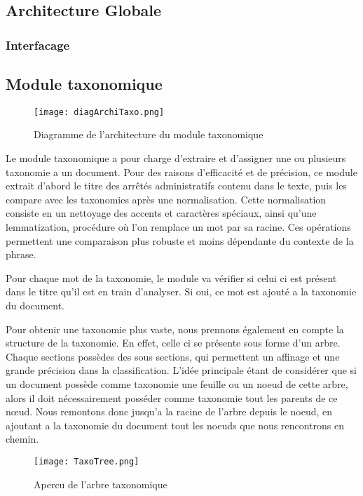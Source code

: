 \subsection{Architecture Globale}

\subsubsection{Interfacage}

\subsection{Module taxonomique}

\begin{figure}[h!]
  \centering
  \texttt{[image: diagArchiTaxo.png]}
	\caption[]{Diagramme de l'architecture du module taxonomique}
  \label{}
\end{figure}


Le module taxonomique a pour charge d'extraire et d'assigner une ou plusieurs taxonomie a un document. Pour des raisons d'efficacité et de précision, ce module extrait d'abord le titre des arrêtés administratifs contenu dans le texte, puis les compare avec les taxonomies après une normalisation. Cette normalisation consiste en un nettoyage des accents et caractères spéciaux, ainsi qu'une lemmatization, procédure où l'on remplace un mot par sa racine. Ces opérations permettent une comparaison plus robuste et moins dépendante du contexte de la phrase. 

Pour chaque mot de la taxonomie, le module va vérifier si celui ci est présent dans le titre qu'il est en train d'analyser. Si oui, ce mot est ajouté a la taxonomie du document.

Pour obtenir une taxonomie plus vaste, nous prennons également en compte la structure de la taxonomie. En effet, celle ci se présente sous forme d'un arbre. Chaque sections possèdes des sous sections, qui permettent un affinage et une grande précision dans la classification. L'idée principale étant de considérer que si un document possède comme taxonomie une feuille ou un noeud de cette arbre, alors il doit nécessairement posséder comme taxonomie tout les parents de ce nœud. Nous remontons donc jusqu'a la racine de l'arbre depuis le noeud, en ajoutant a la taxonomie du document tout les noeuds que nous rencontrons en chemin.
\begin{figure}[h!]
  \centering
  \texttt{[image: TaxoTree.png]}
	\caption[]{Apercu de l'arbre taxonomique}
  \label{}
\end{figure}
